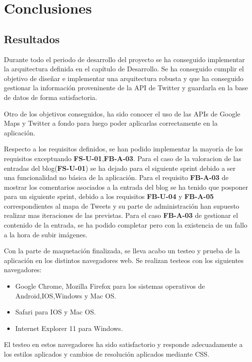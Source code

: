 \chapter{Conclusiones}

\section{Resultados}

Durante todo el periodo de desarrollo del proyecto se ha conseguido implementar la arquitectura definida en el capítulo de Desarrollo. Se ha conseguido cumplir el objetivo
de diseñar e implementar una arquitectura robusta y que ha conseguido gestionar la información proveninente de la API de Twitter y guardarla en la base de datos de forma
satisfactoria.

Otro de los objetivos conseguidos, ha sido conocer el uso de las APIs de Google Maps y Twitter a fondo para luego poder aplicarlas correctamente
en la aplicación.

Respecto a los requisitos definidos, se han podido implementar la mayoría de los requisitos exceptuando \textbf{FS-U-01},\textbf{FB-A-03}. Para el caso de la valoracion de las
entradas del blog(\textbf{FS-U-01}) se ha dejado para el siguiente sprint debido a ser una funcionalidad no básica de la aplicación. Para el requisito \textbf{FB-A-03}
de mostrar los comentarios asociados a la entrada del blog se ha tenido que posponer para un siguiente sprint, debido a los requisitos \textbf{FB-U-04} y \textbf{FB-A-05} correspondientes
al mapa de Tweets y su parte de administración han supuesto realizar mas iteraciones de las previstas. Para el caso \textbf{FB-A-03} de gestionar el contenido de la entrada, se ha
podido completar pero con la existencia de un fallo a la hora de subir imágenes.


Con la parte de maquetación finalizada, se lleva acabo un testeo y prueba de la aplicación en los distintos navegadores web. Se realizan testeos con los siguientes
navegadores:

\begin{itemize}
\item Google Chrome, Mozilla Firefox para los sistemas operativos de Android,IOS,Windows y Mac OS.
\item Safari para IOS y Mac OS.
\item Internet Explorer 11 para Windows.
\end{itemize}

El testeo en estos navegadores ha sido satisfactorio y responde adecuadamente a los estilos aplicados y cambios de resolución aplicados mediante CSS.

